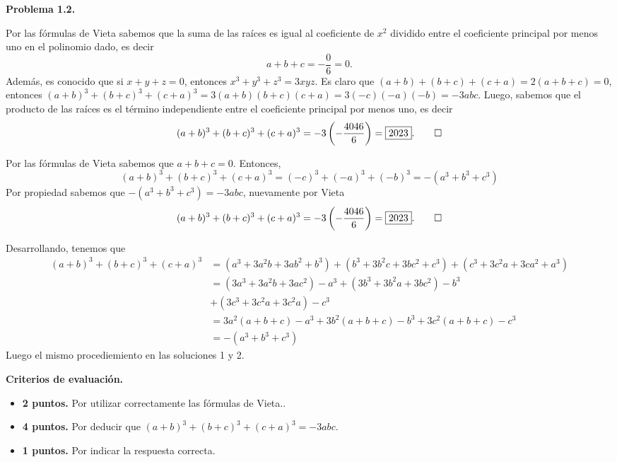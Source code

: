 \newpage
\textbf{Problema 1.2.}
\begin{solution}[1]
    Por las fórmulas de Vieta sabemos que la suma de las raíces es igual al coeficiente de $x^2$ dividido entre el coeficiente principal por menos uno en el polinomio dado, es decir
    \[a + b + c =  -\frac{0}{6} = 0.\]
    Además, es conocido que si $x + y + z = 0$, entonces $x^3 + y^3 + z^3 = 3xyz$.
    Es claro que $(a + b) + (b + c) + (c + a) = 2(a + b + c) = 0$, entonces $(a + b)^3 + (b + c)^3 + (c + a)^3 = 3(a + b)(b + c)(c + a) = 3(-c)(-a)(-b) = -3abc$.
    Luego, sabemos que el producto de las raíces es el término independiente entre el coeficiente principal por menos uno, es decir
    \[
        (a + b)^3 + (b + c)^3 + (c + a)^3 = -3\left(-\frac{4046}{6}\right) = \boxed{2023}.\qedhere
    \]
\end{solution}
\begin{solution}[2]
    Por las fórmulas de Vieta sabemos que $a + b + c = 0$.
    Entonces,
    \[
        (a + b)^3 + (b + c)^3 + (c + a)^3 = (-c)^3 + (-a)^3 + (-b)^3 = -(a^3 + b^3 + c^3)
    \]
    Por propiedad sabemos que $-(a^3 + b^3 + c^3) = - 3abc$, nuevamente por Vieta
    \[
        (a + b)^3 + (b + c)^3 + (c + a)^3 = -3\left(-\frac{4046}{6}\right) = \boxed{2023}.\qedhere
    \]
\end{solution}

\begin{solution}[3]
    Desarrollando, tenemos que
    \begin{align*}
        (a + b)^3 + (b + c)^3 + (c + a)^3 &= (a^3 + 3a^2 b + 3ab^2 + b^3) + (b^3 + 3b^2 c + 3bc^2 + c^3) + (c^3 + 3c^2 a + 3ca^2 + a^3)\\
                                          &= (3a^3 + 3a^2 b + 3ac^2) - a^3 + (3b^3 + 3b^2 a + 3bc^2) - b^3 \\&+ (3c^3 + 3c^2 a + 3c^2 a) - c^3\\
                                            &= 3a^2(a + b + c) - a^3 + 3b^2(a + b + c) - b^3 + 3c^2(a + b + c) - c^3\\
                                        &= - (a^3 + b^3 + c^3)
    \end{align*}
    Luego el mismo procediemiento en las soluciones 1 y 2.
\end{solution}


\textbf{Criterios de evaluación.}
\begin{itemize}
    \item \textbf{2 puntos.} Por utilizar correctamente las fórmulas de Vieta..
    \item \textbf{4 puntos.} Por deducir que $(a + b)^3 + (b + c)^3 + (c + a)^3 = -3abc$.
    \item \textbf{1 puntos.} Por indicar la respuesta correcta.
\end{itemize}